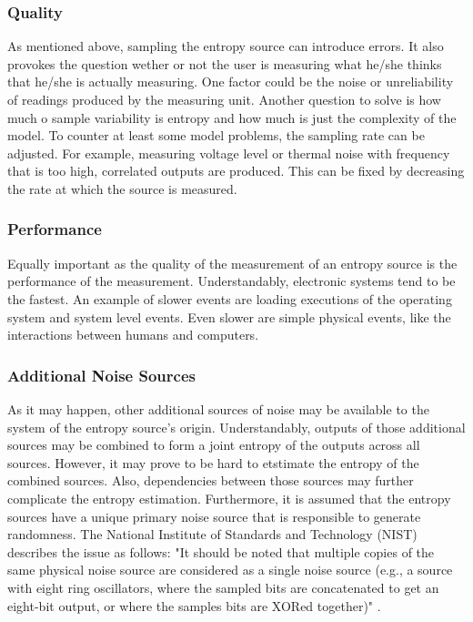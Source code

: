 \subsubsection{Quality}
As mentioned above, sampling the entropy source can introduce errors. It also provokes the question wether or not the user is measuring what he/she thinks that he/she is actually measuring.
One factor could be the noise or unreliability of readings produced by the measuring unit. Another question to solve is how much o sample variability is entropy and how much is just the complexity of the model.
\newline
To counter at least some model problems, the sampling rate can be adjusted. For example, measuring voltage level or thermal noise with frequency that is too high, correlated outputs are produced.
This can be fixed by decreasing the rate at which the source is measured.

\subsubsection{Performance}
Equally important as the quality of the measurement of an entropy source is the performance of the measurement. Understandably, electronic systems tend to be the fastest. An example of slower events are loading executions of the operating system and system level events.
Even slower are simple physical events, like the interactions between humans and computers.

\subsubsection{Additional Noise Sources}
As it may happen, other additional sources of noise may be available to the system of the entropy source's origin.
Understandably, outputs of those additional sources may be combined to form a joint entropy of the outputs across all sources.
However, it may prove to be hard to etstimate the entropy of the combined sources. Also, dependencies between those sources may further complicate the entropy estimation.
\newline
Furthermore, it is assumed that the entropy sources have a unique primary noise source that is responsible to generate randomness. 
The National Institute of Standards and Technology (NIST) describes the issue as follows: "It should be noted that multiple copies of the same physical noise source are considered as a single noise source (e.g., a source with eight ring
oscillators, where the sampled bits are concatenated to get an eight-bit output, or where the samples bits are XORed together)" \cite{randomness:sources1}.

